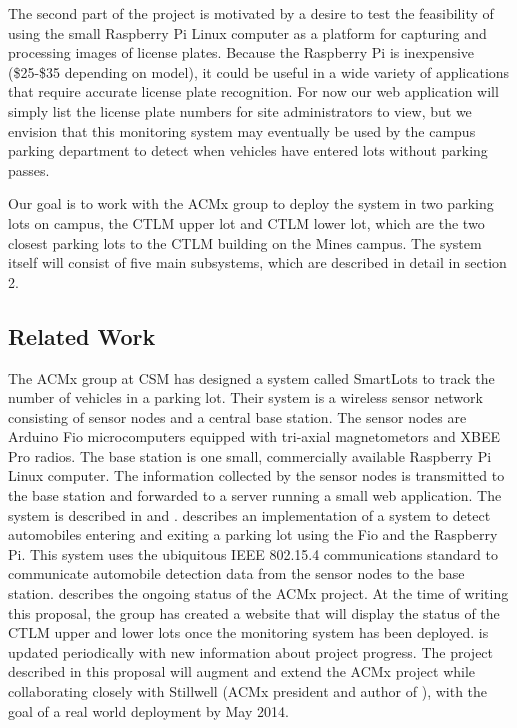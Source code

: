 \documentclass[11pt, oneside, fullpage, doublespace]{article}
\begin{document}
The second part of the project is motivated by a desire to test the feasibility of using the small Raspberry Pi Linux computer as a platform for capturing and processing images of license plates. Because the Raspberry Pi is inexpensive (\$25-\$35 depending on model), it could be useful in a wide variety of applications that require accurate license plate recognition. For now our web application will simply list the license plate numbers for site administrators to view, but we envision that this monitoring system may eventually be used by the campus parking department to detect when vehicles have entered lots without parking passes.

Our goal is to work with the ACMx group to deploy the system in two parking lots on campus, the CTLM upper lot and CTLM lower lot, which are the two closest parking lots to the CTLM building on the Mines campus. The system itself will consist of five main subsystems, which are described in detail in section 2.

\subsection{Related Work}
The ACMx group at CSM has designed a system called SmartLots to track the number of vehicles in a parking lot. Their system is a wireless sensor network consisting of sensor nodes and a central base station. The sensor nodes are Arduino Fio microcomputers equipped with tri-axial magnetometors and XBEE Pro radios. The base station is one small, commercially available Raspberry Pi Linux computer. The information collected by the sensor nodes is transmitted to the base station and forwarded to a server running a small web application. The system is described in \cite{stillwell2013} and \cite{parkingWiki}. \cite{stillwell2013} describes an implementation of a system to detect automobiles entering and exiting a parking lot using the Fio and the Raspberry Pi. This system uses the ubiquitous IEEE 802.15.4 communications standard to communicate automobile detection data from the sensor nodes to the base station. \cite{parkingWiki} describes the ongoing status of the ACMx project. At the time of writing this proposal, the group has created a website that will display the status of the CTLM upper and lower lots once the monitoring system has been deployed. \cite{parkingWiki} is updated periodically with new information about project progress. The project described in this proposal will augment and extend the ACMx project while collaborating closely with Stillwell (ACMx president and author of \cite{stillwell2013}), with the goal of a real world deployment by May 2014.
\end{document}
